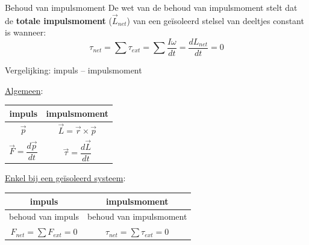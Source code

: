 \begin{lem}{Behoud van impulsmoment}
    De wet van de behoud van impulsmoment stelt dat de \textbf{totale impulsmoment} ($ \Vec{L}_{net} $) van een geïsoleerd stelsel van deeltjes constant is wanneer: 
    \begin{equation*}
         \tau_{net} = \sum \tau_{ext} = \sum \dfrac{I\omega}{dt} = \dfrac{dL_{net}}{dt} = 0
    \end{equation*} 
    \vspace{-0.5cm}
\end{lem}

\begin{app}{Vergelijking: impuls – impulsmoment}
    \begin{minipage}{.48\textwidth}
        \begin{center}
            
            \underline{Algemeen}: \\
            \vspace{0.25cm}
            \def\arraystretch{2.5}
            \begin{tabular}{c|c}
                impuls & impulsmoment \\ \hline
                $ \Vec{p} $ & $ \Vec{L} = \Vec{r} \times \Vec{p} $ \\ 
                $ \Vec{F} = \dfrac{d\Vec{p}}{dt} $ &  $ \Vec{\tau} = \dfrac{d\Vec{L}}{dt} $
            \end{tabular}
    
        \end{center}
    \end{minipage} 
    \begin{minipage}{.48\textwidth}
        \begin{center}
                
            \underline{Enkel bij een geïsoleerd systeem}: \\
            \vspace{0.25cm}
            \def\arraystretch{2.5}
            \begin{tabular}{c|c}
                impuls & impulsmoment \\ \hline
                behoud van impuls & behoud van impulsmoment \\ 
                $ F_{net} = \sum F_{ext} = 0 $ & $ \tau_{net} = \sum \tau_{ext} = 0 $
            \end{tabular}
        
        \end{center}
    \end{minipage}
\end{app}

